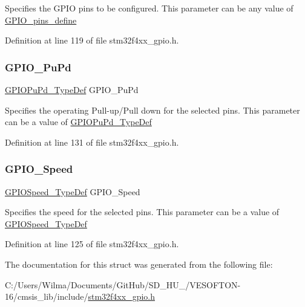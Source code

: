Specifies the G\+P\+IO pins to be configured. This parameter can be any value of \hyperlink{group___g_p_i_o__pins__define}{G\+P\+I\+O\+\_\+pins\+\_\+define} 

Definition at line 119 of file stm32f4xx\+\_\+gpio.\+h.

\mbox{\label{struct_g_p_i_o___init_type_def_aeb0168ffc465346d21f3120aec320b72}} 
\subsubsection{\texorpdfstring{G\+P\+I\+O\+\_\+\+Pu\+Pd}{GPIO\_PuPd}}
{\footnotesize\ttfamily \hyperlink{group___g_p_i_o_gafb7ecd99c44b4fd702d669304a36c2c8}{G\+P\+I\+O\+Pu\+Pd\+\_\+\+Type\+Def} G\+P\+I\+O\+\_\+\+Pu\+Pd}

Specifies the operating Pull-\/up/\+Pull down for the selected pins. This parameter can be a value of \hyperlink{group___g_p_i_o_gafb7ecd99c44b4fd702d669304a36c2c8}{G\+P\+I\+O\+Pu\+Pd\+\_\+\+Type\+Def} 

Definition at line 131 of file stm32f4xx\+\_\+gpio.\+h.

\mbox{\label{struct_g_p_i_o___init_type_def_a57b08335216f50618ebc080e4fbb0a80}} 
\subsubsection{\texorpdfstring{G\+P\+I\+O\+\_\+\+Speed}{GPIO\_Speed}}
{\footnotesize\ttfamily \hyperlink{group___g_p_i_o_ga062ad92b67b4a1f301c161022cf3ba8e}{G\+P\+I\+O\+Speed\+\_\+\+Type\+Def} G\+P\+I\+O\+\_\+\+Speed}

Specifies the speed for the selected pins. This parameter can be a value of \hyperlink{group___g_p_i_o_ga062ad92b67b4a1f301c161022cf3ba8e}{G\+P\+I\+O\+Speed\+\_\+\+Type\+Def} 

Definition at line 125 of file stm32f4xx\+\_\+gpio.\+h.



The documentation for this struct was generated from the following file\+:\begin{DoxyCompactItemize}
\item 
C\+:/\+Users/\+Wilma/\+Documents/\+Git\+Hub/\+S\+D\+\_\+\+H\+U\+\_/\+V\+E\+S\+O\+F\+T\+O\+N-\/16/cmsis\+\_\+lib/include/\hyperlink{stm32f4xx__gpio_8h}{stm32f4xx\+\_\+gpio.\+h}\end{DoxyCompactItemize}
